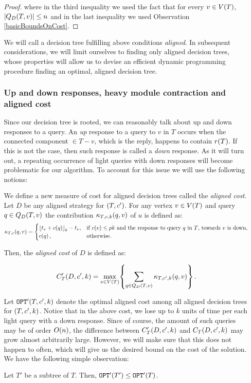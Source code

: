 \begin{lemma}
\begin{proof}
        where in the third inequality we used the fact that for every $v\in V\mathopen{}\left( T \right)$, $\mathopen{}\left| Q_{D}\mathopen{}\left( T,v \right) \right|\leq n$ and in the last inequality we used Observation \ref{basicBoundsOnCost}.
    \end{proof}
\end{lemma}

We will call a decision tree fulfilling above conditions \textit{aligned}. In subsequent considerations, we will limit ourselves to finding only aligned decision trees, whose properties will allow us to devise an efficient dynamic programming procedure finding an optimal, aligned decision tree. 

\subsubsection{Up and down responses, heavy module contraction and aligned cost}
Since our decision tree is rooted, we can reasonably talk about up and down responses to a query. An \textit{up} response to a query to $v$ in $T$ occurs when the connected component $\in T-v$, which is the reply, happens to contain $r\mathopen{}\left( T \right)$. If this is not the case, then such response is called a \textit{down} response. As it will turn out, a repeating occurrence of light queries with down responses will become problematic for our algorithm. To account for this issue we will use the following notions:

We define a new measure of cost for aligned decision trees called the \textit{aligned cost}. Let $D$ be any aligned strategy for $\mathopen{}\left( T,c' \right)$. For any vertex $v\in V\mathopen{}\left( T \right)$ and query $q\in Q_{D}\mathopen{}\left( T,v \right)$ the contribution $\kappa_{T,c,k}\mathopen{}\left( q,v \right)$ of $u$ is defined as:
$$
\kappa_{T,c}\mathopen{}\left( q, v \right)= \begin{cases}
    \mathopen{}\left\lfloor t_v+c\mathopen{}\left( q \right) \right\rfloor_k-t_v, & \text{if } c\mathopen{}\left( v \right)\leq pk \text{ and the response to query $q$ in $T$, towards $v$ is down},\\
    c\mathopen{}\left( q \right), & \text{otherwise}.
\end{cases}
$$

Then, the \textit{aligned cost} of $D$ is defined as:

$$
C'_{T}\mathopen{}\left( D,c',k \right)=\max_{v\in V\mathopen{}\left( T \right)}\mathopen{}\left\{ \sum_{q\in Q_D\mathopen{}\left( T,v \right)}\kappa_{T,c', k}\mathopen{}\left( q,v \right) \right\}.
$$

Let $\texttt{OPT}'\mathopen{}\left( T,c',k \right)$ denote the optimal aligned cost among all aligned decision trees for $\mathopen{}\left( T,c',k \right)$.
Notice that in the above cost, we lose up to $k$ units of time per each light query with a down response. Since of course, the amount of such queries may be of order $O\mathopen{}\left( n \right)$, the difference between $C'_{T}\mathopen{}\left( D,c',k \right)$ and $C_{T}\mathopen{}\left( D,c',k \right)$ may grow almost arbitrarily large. However, we will make sure that this does not happen to often, which will give us the desired bound on the cost of the solution. We have the following simple observation:
\begin{observation}\label{aligned_subtree_opt_observation}
    Let $T'$ be a subtree of $T$. Then, $\texttt{OPT}'\mathopen{}\left( T' \right)\leq\texttt{OPT}'\mathopen{}\left( T \right)$.
\end{observation}

